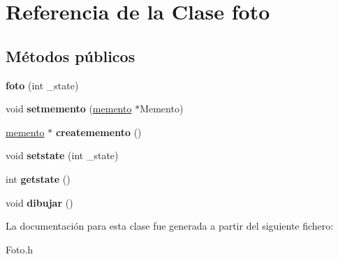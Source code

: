 \hypertarget{classfoto}{}\section{Referencia de la Clase foto}
\label{classfoto}
\subsection*{Métodos públicos}
\begin{DoxyCompactItemize}
\item 
\mbox{\label{classfoto_a87c49edad87afa27208c8377d328107b}} 
{\bfseries foto} (int \+\_\+state)
\item 
\mbox{\label{classfoto_a2ceb27149200585e9455dbeb21977692}} 
void {\bfseries setmemento} (\hyperlink{classmemento}{memento} $\ast$Memento)
\item 
\mbox{\label{classfoto_a41168a5515f628893b54d540168f1884}} 
\hyperlink{classmemento}{memento} $\ast$ {\bfseries creatememento} ()
\item 
\mbox{\label{classfoto_ad57cd1e69ff6abc1a41bbb6c0ce76a7b}} 
void {\bfseries setstate} (int \+\_\+state)
\item 
\mbox{\label{classfoto_a9603dd12c943dce5b2a5f71af155db0b}} 
int {\bfseries getstate} ()
\item 
\mbox{\label{classfoto_a2de57a7bdc220fb3c9c191096aa6a498}} 
void {\bfseries dibujar} ()
\end{DoxyCompactItemize}


La documentación para esta clase fue generada a partir del siguiente fichero\+:\begin{DoxyCompactItemize}
\item 
Foto.\+h\end{DoxyCompactItemize}
